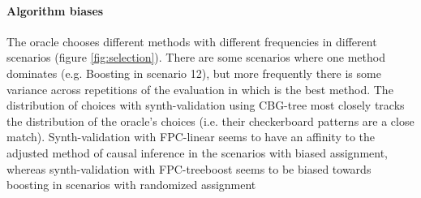 \paragraph{Algorithm biases} The oracle chooses different methods with different frequencies in different scenarios (figure \ref{fig:selection}). There are some scenarios where one method dominates (e.g. Boosting in scenario 12), but more frequently there is some variance across repetitions of the evaluation in which is the best method. The distribution of choices with synth-validation using CBG-tree most closely tracks the distribution of the oracle's choices (i.e. their checkerboard patterns are a close match). Synth-validation with FPC-linear seems to have an affinity to the adjusted method of causal inference in the scenarios with biased assignment, whereas synth-validation with FPC-treeboost seems to be biased towards boosting in scenarios with randomized assignment
